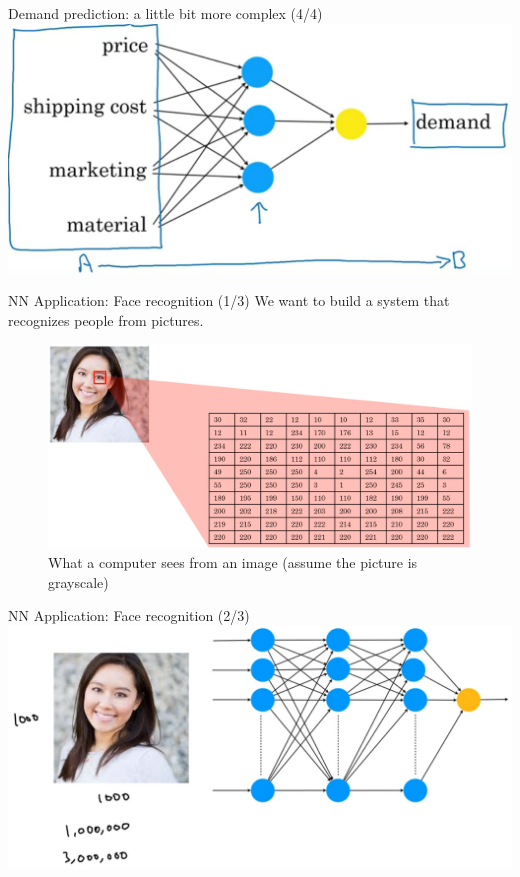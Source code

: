\documentclass[pdf]{beamer}
\theoremstyle{mystyle}
\begin{document}
\begin{frame}{Demand prediction: a little bit more complex (4/4)}
	\centering
	\includegraphics[scale=.275]{demand-prediction-nn-3.png}
\end{frame}


\begin{frame}{NN Application: Face recognition (1/3)}
	We want to build a system that recognizes people from pictures.
	\begin{figure}[!ht]
		\centering
		\includegraphics[scale=.25]{face-recognition-intro}
		\caption{What a computer sees from an image (assume the picture is grayscale)~\citep{ng2019AIForEveryone}}
	\end{figure}
	
\end{frame}

\begin{frame}{NN Application: Face recognition (2/3)}
		\centering
		\includegraphics[scale=.25]{face-recognition-intro-2}
\end{frame}
\end{document}
